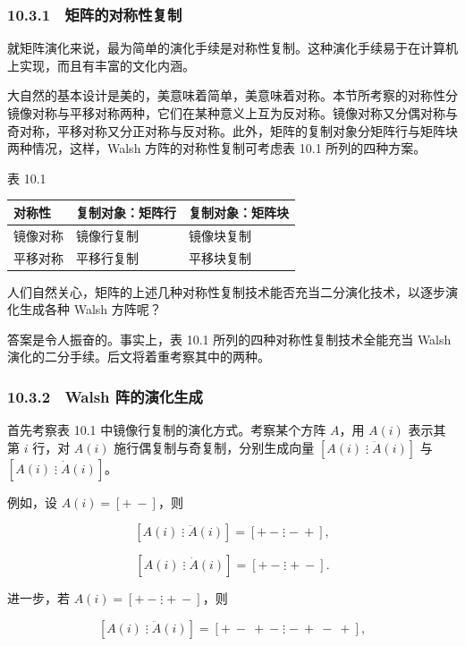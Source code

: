 \subsubsection{10.3.1　矩阵的对称性复制}\label{ch10-ux77e9ux9635ux7684ux5bf9ux79f0ux6027ux590dux5236}

就矩阵演化来说，最为简单的演化手续是对称性复制。这种演化手续易于在计算机上实现，而且有丰富的文化内涵。

大自然的基本设计是美的，美意味着简单，美意味着对称。本节所考察的对称性分镜像对称与平移对称两种，它们在某种意义上互为反对称。镜像对称又分偶对称与奇对称，平移对称又分正对称与反对称。此外，矩阵的复制对象分矩阵行与矩阵块两种情况，这样，Walsh 方阵的对称性复制可考虑表 10.1 所列的四种方案。

表 10.1

{\def\LTcaptype{none} %
\begin{longtable}[]{@{}lll@{}}
\toprule\noalign{}
对称性 & 复制对象：矩阵行 & 复制对象：矩阵块 \\
\midrule\noalign{}
\endhead
\bottomrule\noalign{}
\endlastfoot
镜像对称 & 镜像行复制 & 镜像块复制 \\
平移对称 & 平移行复制 & 平移块复制 \\
\end{longtable}
}

人们自然关心，矩阵的上述几种对称性复制技术能否充当二分演化技术，以逐步演化生成各种 Walsh 方阵呢？

答案是令人振奋的。事实上，表 10.1 所列的四种对称性复制技术全能充当 Walsh 演化的二分手续。后文将着重考察其中的两种。

\subsubsection{10.3.2　Walsh 阵的演化生成}\label{ch10-walsh-ux9635ux7684ux6f14ux5316ux751fux6210}

首先考察表 10.1 中镜像行复制的演化方式。考察某个方阵 \(A\)，用 \(A(i)\) 表示其第 \(i\) 行，对 \(A(i)\) 施行偶复制与奇复制，分别生成向量 \([A(i)\mathrel{\vdots}\ddot A(i)]\) 与 \([A(i)\mathrel{\vdots}\dot A(i)]\)。

例如，设 \(A(i)=[+\ -]\)，则

\[
[A(i)\mathrel{\vdots}\ddot A(i)]=[+\ -\mathrel{\vdots}-\ +],
\]

\[
[A(i)\mathrel{\vdots}\dot A(i)]=[+\ -\mathrel{\vdots}+\ -].
\]

进一步，若 \(A(i)=[+\ -\mathrel{\vdots}+\ -]\)，则

\[
[A(i)\mathrel{\vdots}\ddot A(i)]=[+\ -\ +\ -\mathrel{\vdots}-\ +\ -\ +],
\]

